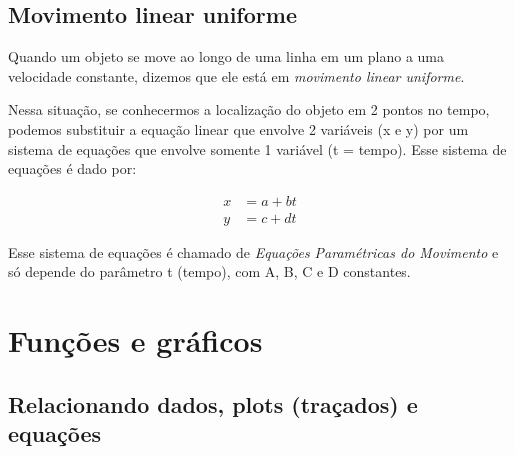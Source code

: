 \documentclass[pdftex, brazil, 12pt, twoside]{article}
\begin{document}
\subsection{Movimento linear uniforme}
\label{modelagem-linear-movimento-uniforme}

Quando um objeto se move ao longo de uma linha em um plano a uma velocidade constante,
dizemos que ele está em \emph{movimento linear uniforme}.

Nessa situação, se
conhecermos a localização do objeto em 2 pontos no tempo, podemos substituir a equação
linear que envolve 2 variáveis (x e y) por um sistema de equações que envolve somente 1
variável (t = tempo). Esse sistema de equações é dado por:

\begin{equation}
  \begin{split}
    x &= a + bt\\
    y &= c + dt
  \end{split}
\end{equation}

Esse sistema de equações é chamado de \emph{Equações Paramétricas do Movimento} e só
depende do parâmetro t (tempo), com A, B, C e D constantes.


\section{Funções e gráficos}
\label{funcoes-graficos}

\subsection{Relacionando dados, plots (traçados) e equações}
\label{funcoes-graficos-relacionando}



\end{document}
